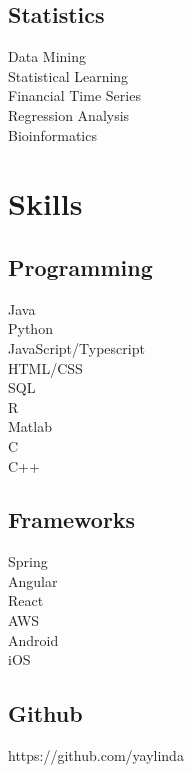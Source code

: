 \documentclass[letterpaper]{deedy-resume} %
\begin{document}
\begin{minipage}[t]{0.29\textwidth}
\sectionspace %

\subsection{Statistics}
\textbullet{} Data Mining\\
\textbullet{} Statistical Learning\\
\textbullet{} Financial Time Series\\
\textbullet{} Regression Analysis\\
\textbullet{} Bioinformatics\\

\sectionspace %


\section{Skills}

\subsection{Programming}

\textbullet{} Java\\
\textbullet{} Python\\
\textbullet{} JavaScript/Typescript\\
\textbullet{} HTML/CSS\\
\textbullet{} SQL\\
\textbullet{} R\\
\textbullet{} Matlab\\
\textbullet{} C\\
\textbullet{} C++

\sectionspace %

\subsection{Frameworks}
\textbullet{} Spring\\
\textbullet{} Angular\\
\textbullet{} React\\
\textbullet{} AWS\\
\textbullet{} Android\\
\textbullet{} iOS\\

\sectionspace %

\subsection{Github}
\textbullet{} https://github.com/yaylinda


\end{minipage} %
\end{document}
